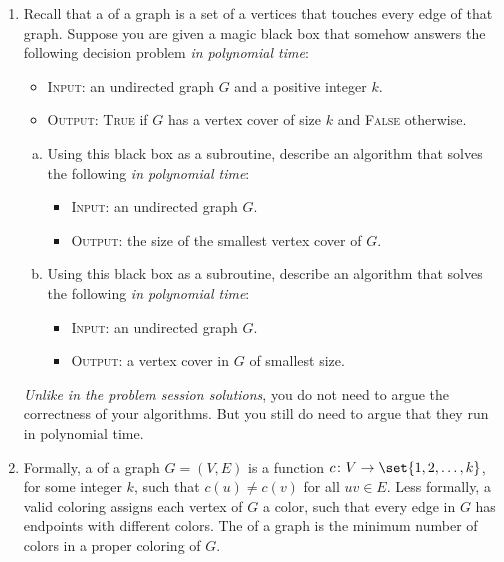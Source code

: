 \documentclass[11pt]{article}
\begin{document}
\begin{enumerate}
\begin{Rubric}{Undecidability proof rubric}
\begin{itemize}
\end{itemize}
\end{Rubric}

\item
Recall that a  of a graph is a set of a vertices that touches every edge of that graph.
Suppose you are given a magic black box that somehow answers the following decision problem \emph{in polynomial time}:
\begin{itemize}
    \item \textsc{Input}: an undirected graph $G$ and a positive integer $k$.
    \item \textsc{Output}: \textsc{True} if $G$ has a vertex cover of size $k$ and \textsc{False} otherwise.
\end{itemize}

\begin{enumerate}[(a)]
    \item Using this black box as a subroutine, describe an algorithm that
    solves the following  \emph{in polynomial time}:
\begin{itemize}
    \item \textsc{Input}: an undirected graph $G$.
    \item \textsc{Output}: the size of the smallest vertex cover of $G$.
\end{itemize}

\item Using this black box as a subroutine, describe an algorithm that solves
the following  \emph{in polynomial time}:
\begin{itemize}
    \item \textsc{Input}: an undirected graph $G$.
    \item \textsc{Output}: a vertex cover in $G$ of smallest size.
\end{itemize}
\end{enumerate}

\emph{Unlike in the problem session solutions}, you do not need to argue the correctness of your algorithms. But you still do need to argue that they run in polynomial time.

\item
Formally, a  of a graph $G=(V,E)$ is a function $c\colon V \to \set{1,2,\dots,k}$, for some integer $k$, such that $c(u)\ne c(v)$ for all $uv\in E$.  Less formally, a valid coloring assigns each vertex of $G$ a color, such that every edge in $G$ has endpoints with different colors.  The  of a graph is the minimum number of colors in a proper coloring of $G$.


\end{enumerate}
\end{document}
